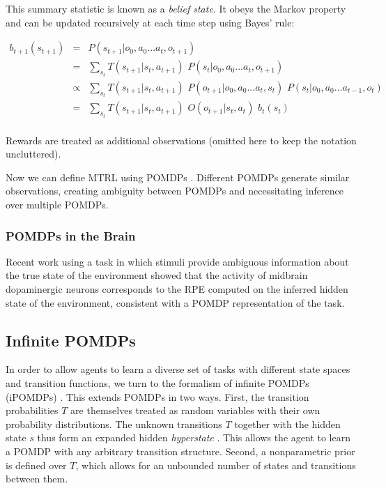 \documentclass[11pt]{article}
\begin{document}
This summary statistic is known as a \textit{belief state}. It obeys the Markov property and can be updated recursively at each time step using Bayes' rule:

\begin{align*}
b_{t+1}(s_{t+1}) &=& P(s_{t+1} | o_0, a_0 ... a_t, o_{t+1})  \\
&=& \sum_{s_t}  T(s_{t+1} | s_t, a_{t+1}) \,\, P(s_t | o_0, a_0 ... a_t, o_{t+1}) \\
&\propto&  \sum_{s_t}  T(s_{t+1} | s_t, a_{t+1})  \,\, P(o_{t+1} | o_0, a_0 ... a_t, s_t) \,\, P(s_t | o_0, a_0 ... a_{t-1}, o_t) \\
&=& \sum_{s_t}  T(s_{t+1} | s_t, a_{t+1}) \,\, O(o_{t+1} | s_t, a_t) \,\, b_t(s_t) \\
\end{align*}

Rewards are treated as additional observations (omitted here to keep the notation uncluttered).

Now we can define MTRL using POMDPs \cite{Li2009}. Different POMDPs generate similar observations, creating ambiguity between POMDPs and necessitating inference over multiple POMDPs.

\subsubsection{POMDPs in the Brain}

Recent work \cite{Starkweather2017} using a task in which stimuli provide ambiguous information about the true state of the environment showed that the activity of midbrain dopaminergic neurons corresponds to the RPE computed on the inferred hidden state of the environment, consistent with a POMDP representation of the task.

\subsection{Infinite POMDPs}

In order to allow agents to learn a diverse set of tasks with different state spaces and transition functions, we turn to the formalism of infinite POMDPs (iPOMDPs) \cite{DoshiVelez2009}. This extends POMDPs in two ways. First, the transition probabilities $T$ are themselves treated as random variables with their own probability distributions. The unknown transitions $T$ together with the hidden state $s$ thus form an expanded hidden \textit{hyperstate} \cite{Duff2002}. This allows the agent to learn a POMDP with any arbitrary transition structure. Second, a nonparametric prior is defined over $T$, which allows for an unbounded number of states and transitions between them.
\end{document}
